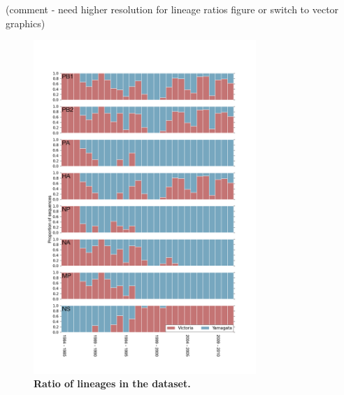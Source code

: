 \documentclass[11pt,oneside,letterpaper]{article}
\begin{document}
(comment - need higher resolution for lineage ratios figure or switch to vector graphics)
\begin{figure}[h]
	\centering	
	\includegraphics[width=0.75\textwidth]	{figures/InfB_LineageRatiosOverTime.png}
	\caption{\textbf{Ratio of lineages in the dataset.}}
	\label{lineageRatiosOverTime}
\end{figure}
\end{document}
